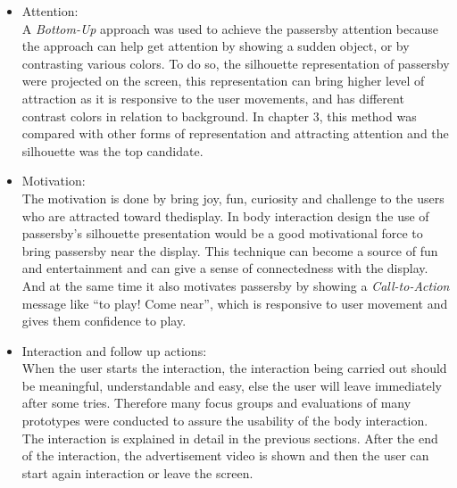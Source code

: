 \begin{itemize}

\item Attention: \\
A \emph{Bottom-Up} approach was used to achieve the passersby attention because the approach can help get attention by showing a sudden object, or by contrasting various colors. To do so, the silhouette representation of passersby were projected on the screen, this representation can bring higher level of attraction as it is responsive to the user movements, and has different contrast colors in relation to background. In chapter 3, this method was compared with other forms of representation and attracting attention and the silhouette was the top candidate.

\item Motivation: \\
The motivation is done by bring joy, fun, curiosity and challenge\cite{ toward_motivation} to the users who are attracted toward thedisplay. In body interaction design the use of passersby’s silhouette presentation would be a good motivational force to bring passersby near the display. This technique can become a source of fun and entertainment and can give a sense of connectedness with the display. And at the same time it also motivates passersby by showing a \emph{Call-to-Action} message like “to play! Come near”, which is responsive to user movement and gives them confidence to play.

\item Interaction and follow up actions: \\
When the user starts the interaction, the interaction being carried out should be meaningful, understandable and easy, else the user will leave immediately after some tries. Therefore many focus groups and evaluations of many prototypes were conducted to assure the usability of the body interaction. The interaction is explained in detail in the previous sections.
After the end of the interaction, the advertisement video is shown and then the user can start again interaction or leave the screen.
\end{itemize}


